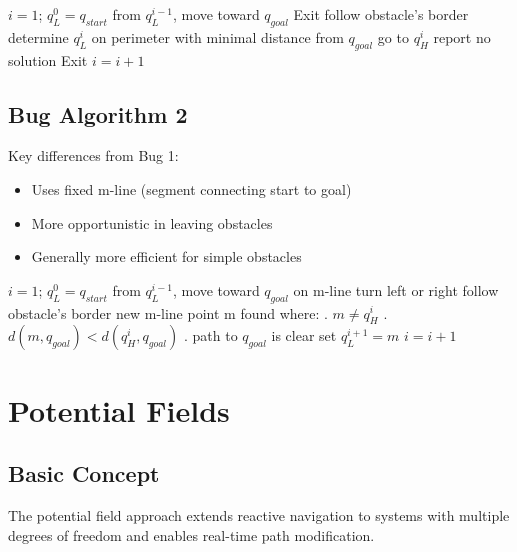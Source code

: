 \documentclass[openany]{book}
\theoremstyle{definition}
\theoremstyle{remark}
\begin{document}
\begin{algorithmic}[1]
\State $i=1$; $q_L^0 = q_{start}$
    \Repeat
        \State from $q_L^{i-1}$, move toward $q_{goal}$
        \State Exit
    \EndIf
    \Repeat
        \State follow obstacle's border
    \State determine $q_L^i$ on perimeter with minimal distance from $q_{goal}$
    \State go to $q_H^i$
        \State report no solution
        \State Exit
    \EndIf
    \State $i = i + 1$
\EndWhile
\end{algorithmic}

\subsection{Bug Algorithm 2}

Key differences from Bug 1:
\begin{itemize}
    \item Uses fixed m-line (segment connecting start to goal)
    \item More opportunistic in leaving obstacles
    \item Generally more efficient for simple obstacles
\end{itemize}

\begin{algorithmic}[1]
\State $i=1$; $q_L^0 = q_{start}$
    \Repeat
        \State from $q_L^{i-1}$, move toward $q_{goal}$ on m-line
    \State turn left or right
    \Repeat
        \State follow obstacle's border
    \State new m-line point m found where:
    . $m \neq q_H^i$ 
    . $d(m,q_{goal}) < d(q_H^i,q_{goal})$
    . path to $q_{goal}$ is clear
    \State set $q_L^{i+1} = m$
    \State $i = i + 1$
\EndWhile
\end{algorithmic}

\section{Potential Fields}

\subsection{Basic Concept}
The potential field approach extends reactive navigation to systems with multiple degrees of freedom and enables real-time path modification.
\end{document}
